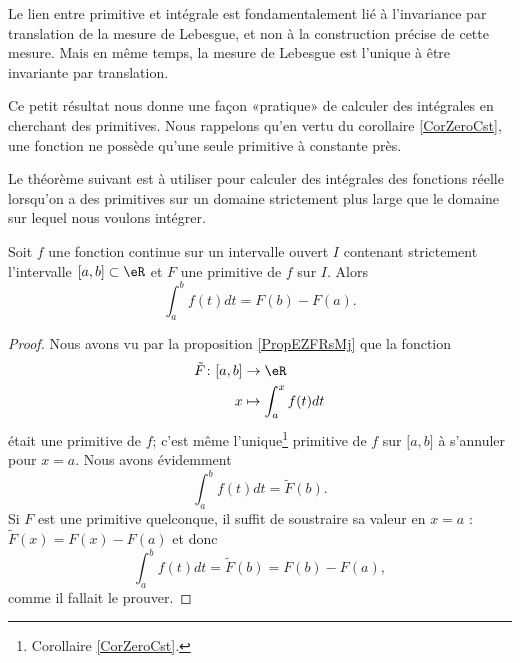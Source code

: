 \begin{remark}
    Le lien entre primitive et intégrale est fondamentalement lié à l'invariance par translation de la mesure de Lebesgue, et non à la construction précise de cette mesure. Mais en même temps, la mesure de Lebesgue est l'unique à être invariante par translation.
\end{remark}

Ce petit résultat nous donne une façon «pratique» de calculer des intégrales en cherchant des primitives. Nous rappelons qu'en vertu du corollaire \ref{CorZeroCst}, une fonction ne possède qu'une seule primitive à constante près.

Le théorème suivant est à utiliser pour calculer des intégrales des fonctions réelle lorsqu'on a des primitives sur un domaine strictement plus large que le domaine sur lequel nous voulons intégrer.
\begin{theorem}    \label{ThoRWXooTqHGbC}
    Soit \( f\) une fonction continue sur un intervalle ouvert \( I\) contenant strictement l'intervalle \( \mathopen[ a , b \mathclose]\subset \eR\) et \( F\) une primitive de \( f\) sur \( I\). Alors
    \begin{equation}
        \int_a^bf(t)dt=F(b)-F(a).
    \end{equation}
\end{theorem}

\begin{proof}
    Nous avons vu par la proposition \ref{PropEZFRsMj} que la fonction
    \begin{equation}
        \begin{aligned}
            \tilde F\colon \mathopen[ a , b \mathclose]&\to \eR \\
            x&\mapsto  \int_a^xf(t)dt
        \end{aligned}
    \end{equation}
    était une primitive de \( f\); c'est même l'unique\footnote{Corollaire \ref{CorZeroCst}.} primitive de \( f\) sur \( \mathopen[ a , b \mathclose]\) à s'annuler pour \( x=a\). Nous avons évidemment
    \begin{equation}
        \int_a^bf(t)dt=\tilde F(b).
    \end{equation}
    Si \( F\) est une primitive quelconque, il suffit de soustraire sa valeur en \( x=a\) : \( \tilde F(x)=F(x)-F(a)\) et donc
    \begin{equation}
        \int_a^bf(t)dt=\tilde F(b)=F(b)-F(a),
    \end{equation}
    comme il fallait le prouver.
\end{proof}

